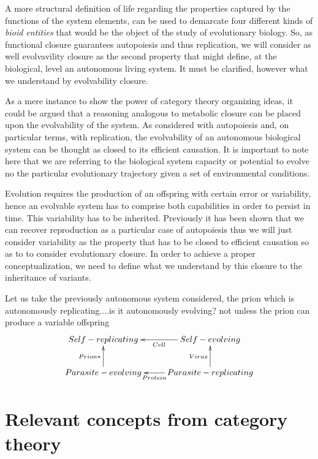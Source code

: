 \documentclass[aps,twocolumn]{revtex4-1}
\begin{document}
A more structural definition of life regarding the properties captured by the functions of the system elements, can be used to demarcate four different kinds of \textit{bioid entities} that would be the object of the study of evolutionary biology. So, as functional closure guarantees autopoiesis and thus replication, we will consider as well evolvavility closure as the second property that might define, at the biological, level an autonomous living system. It must be clarified, however what we understand by evolvability closure. 

As a mere instance to show the power of category theory organizing ideas, it could be argued that a reasoning analogous to metabolic closure can be placed upon the evolvability of the system. As considered with autopoiesis and, on particular terms, with replication, the evolvability of an autonomous biological system can be thought as closed to its efficient causation. It is important to note here that we are referring to the biological system capacity or potential to evolve no the particular evolutionary trajectory given a set of environmental conditions. 

Evolution requires the production of an offspring with certain error or variability, hence an evolvable system has to comprise both capabilities in order to persist in time.  This variability has to be inherited. Previously it has been shown that we can recover reproduction as a particular case of autopoiesis thus we will just consider variability as the property that has to be closed to efficient causation so as to to consider evolutionary closure. In order to achieve a proper conceptualization, we need to define what we understand by this closure to the inheritance of variants. 


Let us take the previously autonomous system considered, the prion which is autonomously replicating....is it autonomously evolving? not unless the prion can produce a variable offspring
\begin{displaymath}
\xymatrix{
Self-replicating & Self-evolving \ar[l]^-{Cell}\\
Parasite-evolving \ar[u]^-{Prion*} & Parasite-replicating \ar[l]^-{Protein}\ar[u]^-{Virus}
}
\end{displaymath}
			  
\section{Relevant concepts from category theory}
\end{document}
